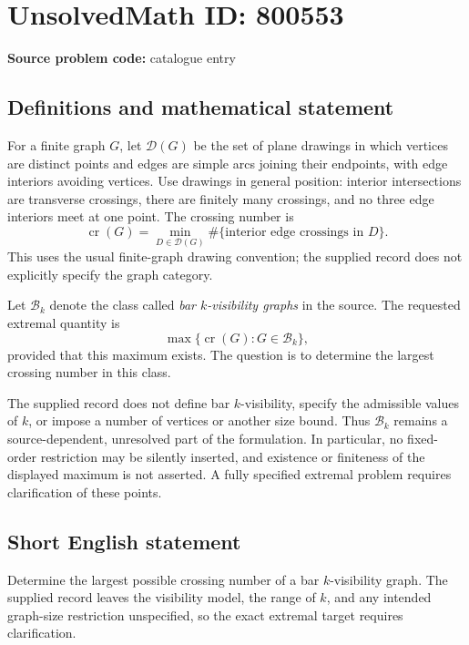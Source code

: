 \documentclass[11pt]{article}
\begin{document}
\section*{UnsolvedMath ID: 800553}
\textbf{Source problem code:} catalogue entry
\subsection{Definitions and mathematical statement}
For a finite graph \(G\), let \(\mathcal D(G)\) be the set of plane drawings in which vertices are distinct points and edges are simple arcs joining their endpoints, with edge interiors avoiding vertices. Use drawings in general position: interior intersections are transverse crossings, there are finitely many crossings, and no three edge interiors meet at one point. The crossing number is
\[
\operatorname{cr}(G)=\min_{D\in\mathcal D(G)}\#\{\text{interior edge crossings in }D\}.
\]
This uses the usual finite-graph drawing convention; the supplied record does not explicitly specify the graph category.

Let \(\mathcal B_k\) denote the class called \emph{bar \(k\)-visibility graphs} in the source. The requested extremal quantity is
\[
\max\{\operatorname{cr}(G):G\in\mathcal B_k\},
\]
provided that this maximum exists. The question is to determine the largest crossing number in this class.

The supplied record does not define bar \(k\)-visibility, specify the admissible values of \(k\), or impose a number of vertices or another size bound. Thus \(\mathcal B_k\) remains a source-dependent, unresolved part of the formulation. In particular, no fixed-order restriction may be silently inserted, and existence or finiteness of the displayed maximum is not asserted. A fully specified extremal problem requires clarification of these points.
\subsection{Short English statement}
Determine the largest possible crossing number of a bar \(k\)-visibility graph. The supplied record leaves the visibility model, the range of \(k\), and any intended graph-size restriction unspecified, so the exact extremal target requires clarification.
\end{document}
